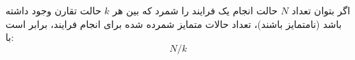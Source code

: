 
\begin{DEFINITION}
    \p
    اگر بتوان تعداد 
    $N$
    حالت انجام یک فرایند را شمرد که بین هر
    $k$
    حالت تقارن وجود داشته باشد
    (نامتمایز باشند)،
    تعداد حالات متمایز شمرده شده برای انجام فرایند، برابر است با:
    $$N/k$$
\end{DEFINITION}

